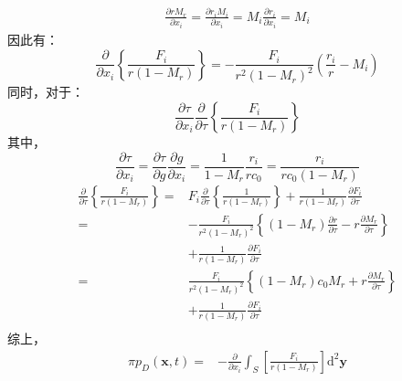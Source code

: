 \begin{enumerate}
\begin{gather}
        \frac{\partial rM_{r}}{\partial x_{i} } = \frac{\partial r_{i}M_{i}}{\partial x_{i} } = M_{i} \frac{\partial r_{i}}{\partial x_{i} } = M_{i}
    \end{gather}
    因此有：
    \begin{equation}
        \frac{\partial}{\partial x_{i}}\left\{\frac{F_{i}}{r\left(1-M_{r}\right)}\right\}
        = - \frac{F_{i}}{r^{2}\left(1-M_{r}\right)^{2}} \left( \frac{r_{i}}{r} - M_{i} \right)
    \end{equation}
    同时，对于：
    \begin{equation}
        \frac{\partial \tau}{\partial x_{i}} \frac{\partial}{\partial \tau}\left\{\frac{F_{i}}{r\left(1-M_{r}\right)}\right\}
    \end{equation}
    其中，
    \begin{equation}
        \frac{\partial \tau}{\partial x_{i}}
        = \frac{\partial \tau}{\partial g} \frac{\partial g}{\partial x_{i}}
        = \frac{1}{1-M_{r}} \frac{r_{i}}{r c_{0}}
        = \frac{r_{i}}{r c_{0} (1-M_{r})}
    \end{equation}
    \begin{equation}
        \begin{aligned}
            \frac{\partial}{\partial \tau}\left\{\frac{F_{i}}{r\left(1-M_{r}\right)}\right\} 
            =& F_{i} \frac{\partial}{\partial \tau}\left\{\frac{1}{r\left(1-M_{r}\right)}\right\} + \frac{1}{r\left(1-M_{r}\right)} \frac{\partial F_{i}}{\partial \tau} \\
            =& - \frac{F_{i}}{r^{2}\left(1-M_{r}\right)^{2}} \left\{ (1-M_{r}) \frac{\partial r}{\partial \tau} - r \frac{\partial M_{r}}{\partial \tau}\right\} \\
             & +\frac{1}{r\left(1-M_{r}\right)} \frac{\partial F_{i}}{\partial \tau} \\
            =& \frac{F_{i}}{r^{2}\left(1-M_{r}\right)^{2}} \left\{ (1-M_{r}) c_{0} M_{r} + r \frac{\partial M_{r}}{\partial \tau}\right\} \\
            & +\frac{1}{r\left(1-M_{r}\right)} \frac{\partial F_{i}}{\partial \tau} \\
        \end{aligned}
    \end{equation}
    综上，
    \begin{equation}
        \begin{aligned}
            \pi p_{D}(\mathbf{x}, t)
            =& -\frac{\partial}{\partial x_{i}} \int_{S}\left[\frac{F_{i}}{r\left(1-M_{r}\right)}\right] \mathrm{d}^{2} \mathbf{y} \\

\end{aligned}
\end{equation}
\end{enumerate}
